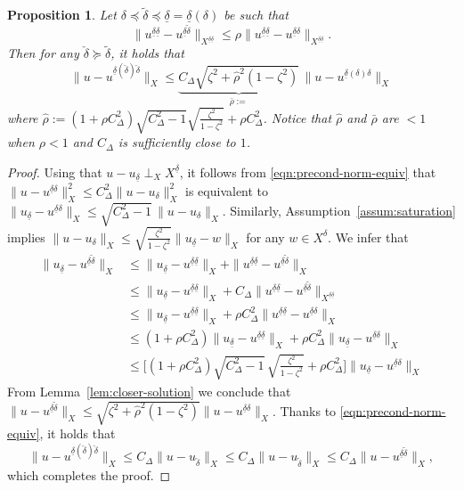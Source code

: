 \documentclass[11pt,a4paper,oneside,english]{amsart}
\numberwithin{equation}{section}
\numberwithin{theorem}{section}
\newtheorem{prop}[theorem]{Proposition}
\theoremstyle{definition}
\newcommand{\udelta}{{\underline{\delta}}}
\newcommand{\jw}[1]{{\color{red}{JW: #1}}}
\begin{document}
\begin{prop}
  \label{prop:construct-improved-solution}
  Let $\delta \preceq \tilde{\delta} \preceq \udelta=\udelta(\delta)$ be such that
  \begin{equation}
    \|u^{\udelta \udelta}-u^{\udelta \tilde{\delta}}\|_{X^{\udelta \udelta}} \leq \rho\|u^{\udelta \udelta}-u^{\udelta \delta}\|_{X^{\udelta \udelta}}.
    \label{eqn:construct-improved-solution}
  \end{equation}
  Then for any $\check{\delta} \succeq \tilde{\delta}$, it holds that
  \[
    \|u-u^{\udelta(\check{\delta}) \check{\delta}}\|_X \leq
    \underbrace{C_\Delta \sqrt{\zeta^2+\hat{\rho}^2(1-\zeta^2)}}_{\bar{\rho}:=}\,\|u-u^{\udelta(\delta) \delta}\|_X
  \]
  where $\hat{\rho}:=(1+\rho C_\Delta^2)\sqrt{C_\Delta^2-1}\sqrt{\frac{\zeta^2}{1-\zeta^2}}+\rho C_\Delta^2$.
  Notice that $\hat{\rho}$ and $\bar{\rho}$ are $<1$ when $\rho<1$ and $C_\Delta$ is sufficiently close to $1$.\jw{oef alle diacritics duizelen me hier}
\end{prop}
\begin{proof}
  Using that $u-u_\udelta \perp_X X^\udelta$, it follows from \eqref{eqn:precond-norm-equiv} that
  $\|u-u^{\udelta \delta}\|_X^2 \leq C_\Delta^2 \|u-u_\delta\|_X^2$ is equivalent to
  $\|u_\udelta-u^{\udelta \delta}\|_X \leq \sqrt{C_\Delta^2 -1}\, \|u-u_{\delta}\|_X$.
  Similarly, Assumption~\ref{assum:saturation} implies $\|u-u_\delta\|_X \leq \sqrt{\frac{\zeta^2}{1-\zeta^2}} \|u_\udelta-w\|_X$ for any $w \in X^\delta$.
  We infer that
  \begin{align*}
    \|u_\udelta-u^{\udelta \tilde{\delta}}\|_X &\leq \|u_\udelta-u^{\udelta \udelta}\|_X+\|u^{\udelta \udelta}-u^{\udelta \tilde{\delta}}\|_X\\
    &\leq \|u_\udelta-u^{\udelta \udelta}\|_X+C_\Delta\|u^{\udelta \udelta}-u^{\udelta \tilde{\delta}}\|_{X^{\udelta \udelta}}\\
    &\leq \|u_\udelta-u^{\udelta \udelta}\|_X+\rho C_\Delta^2  \|u^{\udelta \udelta}-u^{\udelta \delta}\|_{X}\\
    &\leq (1+\rho C_\Delta^2) \|u_\udelta-u^{\udelta \udelta}\|_X+\rho C_\Delta^2  \|u_\udelta-u^{\udelta \delta}\|_{X}\\
    &\leq \Big[{\textstyle (1+\rho C_\Delta^2)\sqrt{C_\Delta^2-1}\,\sqrt{\frac{\zeta^2}{1-\zeta^2}}+\rho C_\Delta^2} \Big]\|u_\udelta-u^{\udelta \delta}\|_{X}
  \end{align*}
  From Lemma~\ref{lem:closer-solution} we conclude that
  $\|u-u^{\udelta \tilde{\delta}}\|_X \leq \sqrt{\zeta^2+\hat{\rho}^2(1-\zeta^2)} \|u-u^{\udelta \delta}\|_{X}$.
  Thanks to \eqref{eqn:precond-norm-equiv}, it holds that
  \[
    \|u-u^{\udelta(\check{\delta}) \check{\delta}}\|_X
    \leq C_\Delta \|u-u_{\check{\delta}}\|_X
    \leq C_\Delta \|u-u_{\tilde{\delta}}\|_X
    \leq C_\Delta \|u-u^{\udelta \tilde{\delta}}\|_X,
  \]
  which completes the proof.\jw{deze proof heb ik niet gecontroleerd}
\end{proof}
\end{document}
